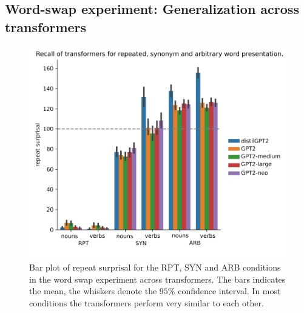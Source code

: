 \subsection{Word-swap experiment: Generalization across transformers}

\begin{figure}[H]
    \centering
    \includegraphics[width=\textwidth]{experiments/word_swap_all.pdf}
    \caption{Bar plot of repeat surprisal for the RPT, SYN and ARB conditions in the word swap experiment across transformers. The bars indicates the mean, the whiskers denote the $95\%$ confidence interval. In most conditions the transformers perform very similar to each other.}
    \label{fig:word_swap_all}
\end{figure}
